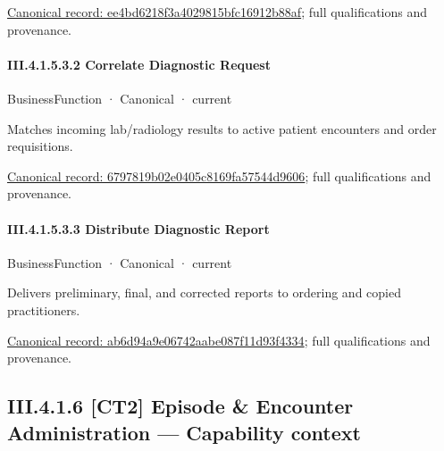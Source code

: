 {\footnotesize \href{../../../../continuum/business/business-function/ee4bd6218f3a4029815bfc16912b88af.md}{Canonical record: ee4bd6218f3a4029815bfc16912b88af}; full qualifications and provenance.}\par
\paragraph*{III.4.1.5.3.2 Correlate Diagnostic Request}
\label{navigation:III.4.1.5.3.2}

\label{element:6797819b02e0405c8169fa57544d9606}
{\small BusinessFunction · Canonical · current}\par

Matches incoming lab/radiology results to active patient encounters and order requisitions.


{\footnotesize \href{../../../../continuum/business/business-function/6797819b02e0405c8169fa57544d9606.md}{Canonical record: 6797819b02e0405c8169fa57544d9606}; full qualifications and provenance.}\par
\paragraph*{III.4.1.5.3.3 Distribute Diagnostic Report}
\label{navigation:III.4.1.5.3.3}

\label{element:ab6d94a9e06742aabe087f11d93f4334}
{\small BusinessFunction · Canonical · current}\par

Delivers preliminary, final, and corrected reports to ordering and copied practitioners.


{\footnotesize \href{../../../../continuum/business/business-function/ab6d94a9e06742aabe087f11d93f4334.md}{Canonical record: ab6d94a9e06742aabe087f11d93f4334}; full qualifications and provenance.}\par
\subsection*{III.4.1.6 [CT2] Episode \& Encounter Administration — Capability context}
\label{navigation:III.4.1.6}

